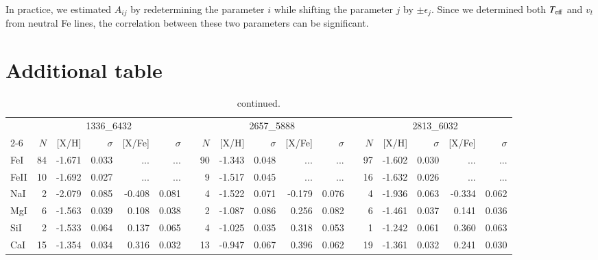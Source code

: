 \documentclass{aa}
\begin{document}
\begin{appendix}
In practice, we estimated $A_{ij}$ by redetermining the parameter $i$ while shifting the parameter $j$ by $\pm\epsilon_j$.
Since we determined both $T_{\rm eff}$ and $v_t$ from neutral Fe lines, the correlation between these two parameters can be significant.


\section{Additional table}

\clearpage
\onecolumn

\begin{landscape}
\begin{longtable}{lrrrrrrrrrrrrrrrrr}
\caption{\label{tab:abundance}Abundances of Sequoia stars}\\
\hline\hline
\endfirsthead
\caption{continued.}\\
\hline\hline
\endhead
\hline
\endfoot
     &                     \multicolumn{5}{c}{1336\_6432}&&                     \multicolumn{5}{c}{2657\_5888}&&                     \multicolumn{5}{c}{2813\_6032}\\\cline{2-6}\cline{8-12}\cline{14-18}
     & $N$ & [{X}/{H}] & $\sigma$ & [{X}/{Fe}] & $\sigma$&& $N$ & [{X}/{H}] & $\sigma$ & [{X}/{Fe}] & $\sigma$&& $N$ & [{X}/{H}] & $\sigma$ & [{X}/{Fe}] & $\sigma$\\\hline
FeI  &     84&    -1.671&     0.033&       ...&       ...&&     90&    -1.343&     0.048&       ...&       ...&&     97&    -1.602&     0.030&       ...&       ...\\
FeII &     10&    -1.692&     0.027&       ...&       ...&&      9&    -1.517&     0.045&       ...&       ...&&     16&    -1.632&     0.026&       ...&       ...\\
NaI  &      2&    -2.079&     0.085&    -0.408&     0.081&&      4&    -1.522&     0.071&    -0.179&     0.076&&      4&    -1.936&     0.063&    -0.334&     0.062\\
MgI  &      6&    -1.563&     0.039&     0.108&     0.038&&      2&    -1.087&     0.086&     0.256&     0.082&&      6&    -1.461&     0.037&     0.141&     0.036\\
SiI  &      2&    -1.533&     0.064&     0.137&     0.065&&      4&    -1.025&     0.035&     0.318&     0.053&&      1&    -1.242&     0.061&     0.360&     0.063\\
CaI  &     15&    -1.354&     0.034&     0.316&     0.032&&     13&    -0.947&     0.067&     0.396&     0.062&&     19&    -1.361&     0.032&     0.241&     0.030\\

\end{longtable}
\end{landscape}
\end{appendix}
\end{document}
